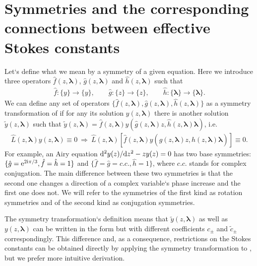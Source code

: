 \documentclass[12pt]{iopart}
\def\f{\hat{f}}
\def\g{\hat{g}}
\def\h{\hat{h}}
\def\L{\widehat{L}}
\def\lmbd{\bm{\lambda}}
\def\unity{1}
\begin{document}
\section{Symmetries and the corresponding connections between effective Stokes constants \label{sec:smmtrs}}
Let`s define what we mean by a symmetry of a given equation. Here we introduce three operators
$\f(z,\lmbd)$, $\g(z,\lmbd)$ and $\h(z,\lmbd)$ such that
\begin{eqnarray}
\f:\{y\} \rightarrow \{y\}, \qquad
\g:\{z\} \rightarrow \{z\}, \qquad
\h:\{\lmbd\} \rightarrow \{\lmbd\}.
\end{eqnarray}
We can define any set of operators $\{\f(z,\lmbd),\g(z,\lmbd),\h(z,\lmbd)\}$ as a symmetry 
transformation of 
if for any its solution $y(z,\lmbd)$ there is another solution $\tilde{y}(z,\lmbd)$ such that
$\tilde{y}(z,\lmbd)=\f(z,\lmbd)y(\g(z,\lmbd)z,\h(z,\lmbd)\lmbd)$, i.e.
\begin{eqnarray}
\L(z,\lmbd)y(z,\lmbd) \equiv 0 \ \Longrightarrow\  
\L(z,\lmbd) \left[ \f(z,\lmbd)y(\g(z,\lmbd)z,\h(z,\lmbd)\lmbd) \right] \equiv 0.   \label{eq:symdef}
\end{eqnarray}
For example, an Airy equation $\mathrm{d}^2 y(z)/\mathrm{d} z^2 - z y(z) = 0$ has two base symmetries: 
$\{\g=\rme^{2 \rmi \pi/3},\f=\h=\unity\}$ and $\{\f=\g=c.c.,\h=\unity\}$, where 
$c.c.$ stands 
for complex conjugation. The main difference between these two symmetries is that the second 
one changes a direction of a complex variable`s phase increase and the first one does not. 
We will refer to the symmetries of the first kind as rotation symmetries and of the second 
kind as conjugation symmetries.

The symmetry transformation`s definition  means that 
$\tilde{y}(z,\lmbd)$ as well as $y(z,\lmbd)$ can be written in the form 
but with different coefficients $c_\pm$ and $\tilde{c}_\pm$ correspondingly. 
This difference and, as a consequence, restrictions on the Stokes constants 
can be obtained directly by applying the symmetry transformation to , 
but we prefer more intuitive derivation.
\end{document}
